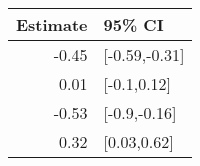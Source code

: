 \begin{tabular}{rl}
  \hline
Estimate & 95\% CI \\ 
  \hline
-0.45 & [-0.59,-0.31] \\ 
  0.01 & [-0.1,0.12] \\ 
  -0.53 & [-0.9,-0.16] \\ 
  0.32 & [0.03,0.62] \\ 
   \hline
\end{tabular}

